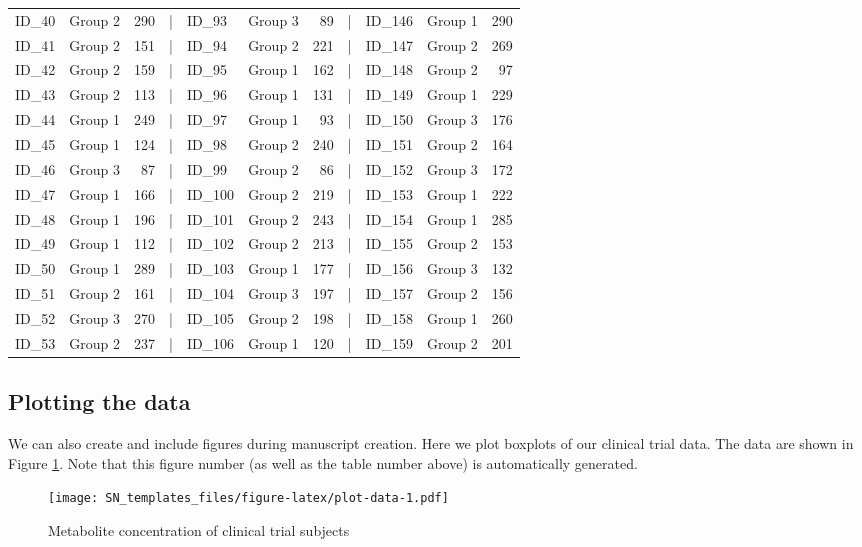 \documentclass[smallextended]{svjour3}       %
\begin{document}
\begin{table}
\begin{tabular}[t]{llrlllrlllr}
ID\_40 & Group 2 & 290 & | & ID\_93 & Group 3 & 89 & | & ID\_146 & Group 1 & 290\\
\addlinespace
ID\_41 & Group 2 & 151 & | & ID\_94 & Group 2 & 221 & | & ID\_147 & Group 2 & 269\\
ID\_42 & Group 2 & 159 & | & ID\_95 & Group 1 & 162 & | & ID\_148 & Group 2 & 97\\
ID\_43 & Group 2 & 113 & | & ID\_96 & Group 1 & 131 & | & ID\_149 & Group 1 & 229\\
ID\_44 & Group 1 & 249 & | & ID\_97 & Group 1 & 93 & | & ID\_150 & Group 3 & 176\\
ID\_45 & Group 1 & 124 & | & ID\_98 & Group 2 & 240 & | & ID\_151 & Group 2 & 164\\
\addlinespace
ID\_46 & Group 3 & 87 & | & ID\_99 & Group 2 & 86 & | & ID\_152 & Group 3 & 172\\
ID\_47 & Group 1 & 166 & | & ID\_100 & Group 2 & 219 & | & ID\_153 & Group 1 & 222\\
ID\_48 & Group 1 & 196 & | & ID\_101 & Group 2 & 243 & | & ID\_154 & Group 1 & 285\\
ID\_49 & Group 1 & 112 & | & ID\_102 & Group 2 & 213 & | & ID\_155 & Group 2 & 153\\
ID\_50 & Group 1 & 289 & | & ID\_103 & Group 1 & 177 & | & ID\_156 & Group 3 & 132\\
\addlinespace
ID\_51 & Group 2 & 161 & | & ID\_104 & Group 3 & 197 & | & ID\_157 & Group 2 & 156\\
ID\_52 & Group 3 & 270 & | & ID\_105 & Group 2 & 198 & | & ID\_158 & Group 1 & 260\\
ID\_53 & Group 2 & 237 & | & ID\_106 & Group 1 & 120 & | & ID\_159 & Group 2 & 201\\
\bottomrule
\end{tabular}
\end{table}

\hypertarget{sec:3}{%
\subsection{Plotting the data}\label{sec:3}}

We can also create and include figures during manuscript creation. Here we plot boxplots of our clinical trial data. The data are shown in Figure \ref{fig:plot-data}. Note that this figure number (as well as the table number above) is automatically generated.

\begin{figure}
\centering
\texttt{[image: SN\_templates\_files/figure-latex/plot-data-1.pdf]}
\caption{\label{fig:plot-data}Metabolite concentration of clinical trial subjects}
\end{figure}
\end{document}
